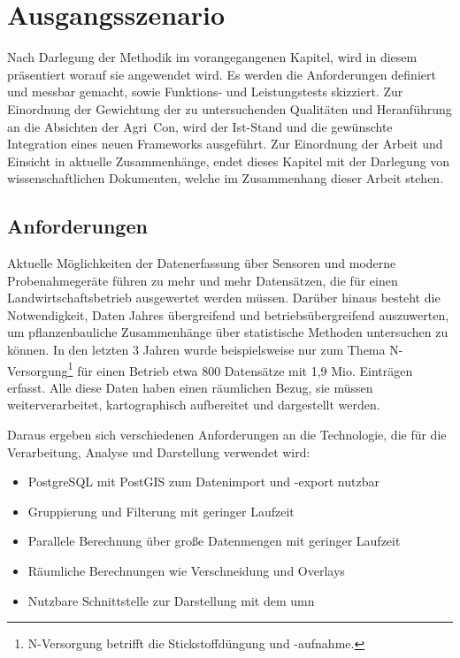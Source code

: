 \chapter{Ausgangsszenario}
\label{chapter:ausgangsszenario}
Nach Darlegung der Methodik im vorangegangenen Kapitel, wird in diesem präsentiert worauf sie angewendet wird.
Es werden die Anforderungen definiert und messbar gemacht, sowie Funktions- und Leistungstests skizziert.
Zur Einordnung der Gewichtung der zu untersuchenden Qualitäten und Heranführung an die Absichten der Agri~Con, wird der Ist-Stand und die gewünschte Integration eines neuen Frameworks ausgeführt.
Zur Einordnung der Arbeit und Einsicht in aktuelle Zusammenhänge, endet dieses Kapitel mit der Darlegung von wissenschaftlichen Dokumenten, welche im Zusammenhang dieser Arbeit stehen.

\section{Anforderungen}
\label{Anforderungen}
Aktuelle Möglichkeiten der Datenerfassung über Sensoren und moderne Probenahmegeräte führen zu mehr und mehr Datensätzen, die für einen Landwirtschaftsbetrieb ausgewertet werden müssen. Darüber hinaus besteht die Notwendigkeit, Daten Jahres übergreifend und betriebsübergreifend auszuwerten, um pflanzenbauliche Zusammenhänge über statistische Methoden untersuchen zu können.
In den letzten 3 Jahren wurde beispielsweise nur zum Thema N-Versorgung\footnote{N-Versorgung betrifft die Stickstoffdüngung und -aufnahme.} für einen Betrieb etwa 800 Datensätze mit 1,9 Mio. Einträgen erfasst. Alle diese Daten haben einen räumlichen Bezug, sie müssen weiterverarbeitet, kartographisch aufbereitet und dargestellt werden.

Daraus ergeben sich verschiedenen Anforderungen an die Technologie, die für die Verarbeitung, Analyse und Darstellung verwendet wird:
\begin{itemize}
\item PostgreSQL mit PostGIS zum Datenimport und -export nutzbar
\item Gruppierung und Filterung mit geringer Laufzeit
\item Parallele Berechnung über große Datenmengen mit geringer Laufzeit
\item Räumliche Berechnungen wie Verschneidung und Overlays
\item Nutzbare Schnittstelle zur Darstellung mit dem \Gls{umn}
\end{itemize}

